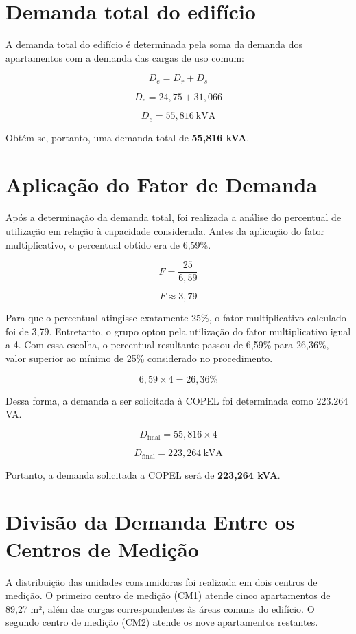 \documentclass[12pt,openright,oneside,a4paper,brazil]{abntex2}
\begin{document}
\section{Demanda total do edifício}

\hspace{1.27cm}A demanda total do edifício é determinada pela soma da demanda dos apartamentos com a demanda das cargas de uso comum:

\begin{equation}
    D_e = D_r + D_s
    \label{eq:demanda_total_edificio}
\end{equation}

\[
D_e = 24,75 + 31,066
\]

\[
D_e = 55,816\ \mathrm{kVA}
\]

Obtém-se, portanto, uma demanda total de \textbf{55,816 kVA}.

\section{Aplicação do Fator de Demanda}
\hspace{1.27cm}Após a determinação da demanda total, foi realizada a análise do percentual de utilização em relação à capacidade considerada. Antes da aplicação do fator multiplicativo, o percentual obtido era de 6,59\%.

\[
F = \frac{25}{6,59}
\]

\[
F \approx 3,79
\]

\hspace{1.27cm}Para que o percentual atingisse exatamente 25\%, o fator multiplicativo calculado foi de 3,79. Entretanto, o grupo optou pela utilização do fator multiplicativo igual a 4. Com essa escolha, o percentual resultante passou de 6,59\% para 26,36\%, valor superior ao mínimo de 25\% considerado no procedimento.

\[
6,59 \times 4 = 26,36\%
\]

Dessa forma, a demanda a ser solicitada à COPEL foi determinada como 223.264 VA.

\[
D_{\mathrm{final}} = 55,816 \times 4
\]

\[
D_{\mathrm{final}} = 223,264\ \mathrm{kVA}
\]

Portanto, a demanda solicitada a COPEL será de \textbf{223,264 kVA}.

\section{Divisão da Demanda Entre os Centros de Medição}
\hspace{1.27cm}A distribuição das unidades consumidoras foi realizada em dois centros de medição. O primeiro centro de medição (CM1) atende cinco apartamentos de 89,27 m², além das cargas correspondentes às áreas comuns do edifício. O segundo centro de medição (CM2) atende os nove apartamentos restantes.
\end{document}
